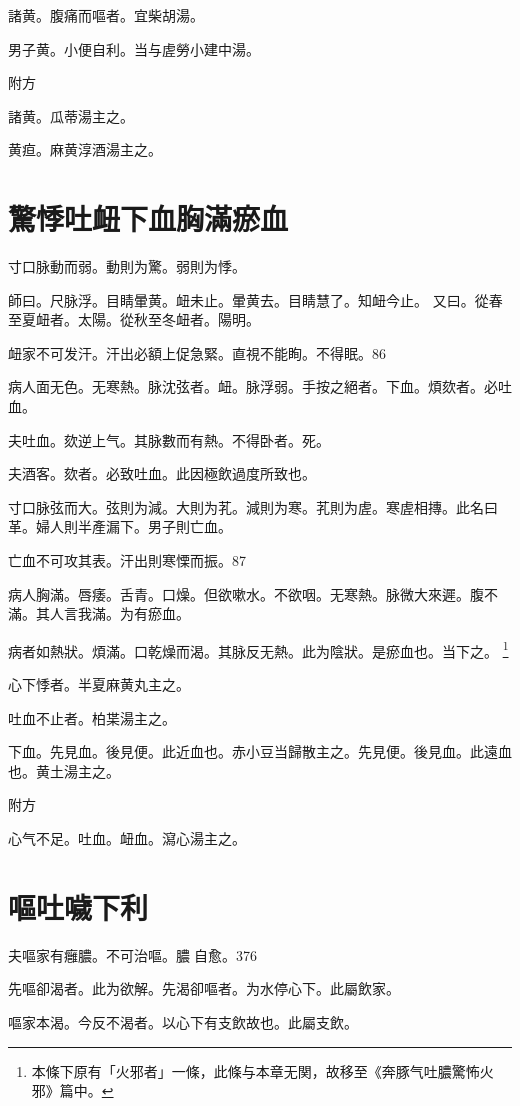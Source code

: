 諸黄。腹痛而嘔者。宜柴胡湯。

男子黄。小便自利。当与虗勞小建中湯。

附方

諸黄。瓜蒂湯主之。

黄疸。麻黄淳酒湯主之。

\chapter{驚悸吐衄下血胸滿瘀血}

寸口脉動而弱。動則为驚。弱則为悸。

師曰。尺脉浮。目睛暈黄。衄未止。暈黄去。目睛慧了。知衄今止。
又曰。從春至夏衄者。太陽。從秋至冬衄者。陽明。

衄家不可发汗。汗出必額上促急{\khaaitp 緊}。直視不能眴。不得眠。86

病人面无色。无寒熱。脉沈弦者。衄。{\khaaitp 脉}浮弱。手按之絕者。下血。煩欬者。必吐血。

夫吐血。欬逆上气。其脉數而有熱。不得卧者。死。

夫酒客。欬者。必致吐血。此因極飲過度所致也。

寸口脉弦而大。弦則为減。大則为芤。減則为寒。芤則为虗。寒虗相摶。此名曰革。婦人則半產漏下。男子則亡血。

亡血不可攻其表。汗出則寒慄而振。87

病人胸滿。唇痿。舌青。口燥。但欲嗽水。不欲咽。无寒熱。脉微大來遲。腹不滿。其人言我滿。为有瘀血。

病者如熱狀。煩滿。口乾燥而渴。其脉反无熱。此为陰狀。是瘀血也。当下之。
	\footnote{
		本條下原有「火邪者」一條，此條与本章无関，故移至《奔豚气吐膿驚怖火邪》篇中。
	}

心下悸者。半夏麻黄丸主之。

吐血不止者。柏枼湯主之。

下血。先見血。後見便。此近血也。赤小豆当歸散主之。先見便。後見血。此遠血也。黄土湯主之。

附方

心气不足。吐血。衄血。瀉心湯主之。

\chapter{嘔吐噦下利}

夫嘔家有癰膿。不可治嘔。膿{\sungtpii 𥁞}自愈。376

先嘔卻渴者。此为欲解。先渴卻嘔者。为水停心下。此屬飲家。

嘔家本渴。今反不渴者。以心下有支飲故也。此屬支飲。

